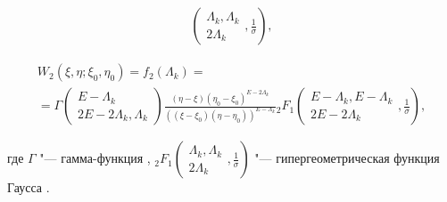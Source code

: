 \begin{enumerate}
\begin{multline*}
\left(

\begin{array}{c}

 \Lambda_k,\Lambda_k\\

2\Lambda_k

\end{array}

,\frac{1}{\sigma}

\right),

\end{multline*}

\begin{multline*}

 W_2(\xi,\eta;\xi_0,\eta_0)=f_2(\Lambda_k)=

 \\

  =\Gamma\left(\!\!

\begin{array}{c}

 E-\Lambda_k\\

2E-2\Lambda_k,\Lambda_k

\end{array} \!\!

\right)

\frac{(\eta-\xi)(\eta_0-\xi_0)^{E-2\Lambda_k}}{((\xi-\xi_0)(\eta-\eta_0))^{E-\Lambda_k}}




{}_2 F_1

\left(\!\!

\begin{array}{c}

 E-\Lambda_k,E-\Lambda_k\\

2E-2\Lambda_k

\end{array}

,\frac{1}{\sigma}\!

\right),

\end{multline*}

где $\Gamma$ "--- гамма-функция \cite{Abramovic}, ${}_2 F_1

\left(

\begin{array}{c}

 \Lambda_k,\Lambda_k\\

2\Lambda_k

\end{array}

,\frac{1}{\sigma}

\right)$ "--- гипергеометрическая функция Гаусса \cite{beit}. 

\end{enumerate}



